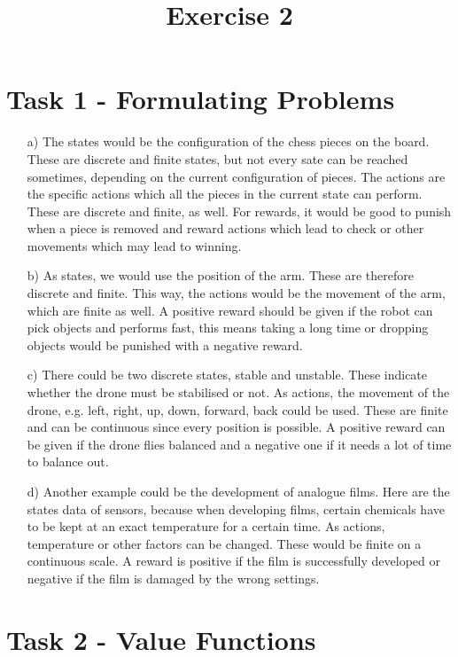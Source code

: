 \documentclass[a4paper]{article}
\date{}
\author{}
\title{\textbf{Exercise 2}}
\begin{document}
\maketitle 
\thispagestyle{fancy}

\section*{Task 1 - Formulating Problems}

\begin{enumerate}
	\item[a)] 
	The states would be the configuration of the chess pieces on the board. 
	These are discrete and finite states, but not every sate can be reached sometimes, depending on the current configuration of pieces.
	The actions are the specific actions which all the pieces in the current state can perform. 
	These are discrete and finite, as well. 
	For rewards, it would be good to punish when a piece is removed and reward actions which lead to check or other movements which may lead to winning.
	\item[b)] 
	As states, we would use the position of the arm. 
	These are therefore discrete and finite.
	This way, the actions would be the movement of the arm, which are finite as well. 
	A positive reward should be given if the robot can pick objects and performs fast, this means taking a long time or dropping objects would be punished with a negative reward. 
	\item[c)] 
	There could be two discrete states, stable and unstable. 
	These indicate whether the drone must be stabilised or not. 
	As actions, the movement of the drone, e.g. left, right, up, down, forward, back could be used. 
	These are finite and can be continuous since every position is possible. 
	A positive reward can be given if the drone flies balanced and a negative one if it needs a lot of time to balance out. 
	\item[d)] 
	Another example could be the development of analogue films. 
	Here are the states data of sensors, because when developing films, certain chemicals have to be kept at an exact temperature for a certain time. 
	As actions, temperature or other factors can be changed. 
	These would be finite on a continuous scale. 
	A reward is positive if the film is successfully developed or negative if the film is damaged by the wrong settings. 
	
\end{enumerate}

\section*{Task 2 - Value Functions}
\end{document}
